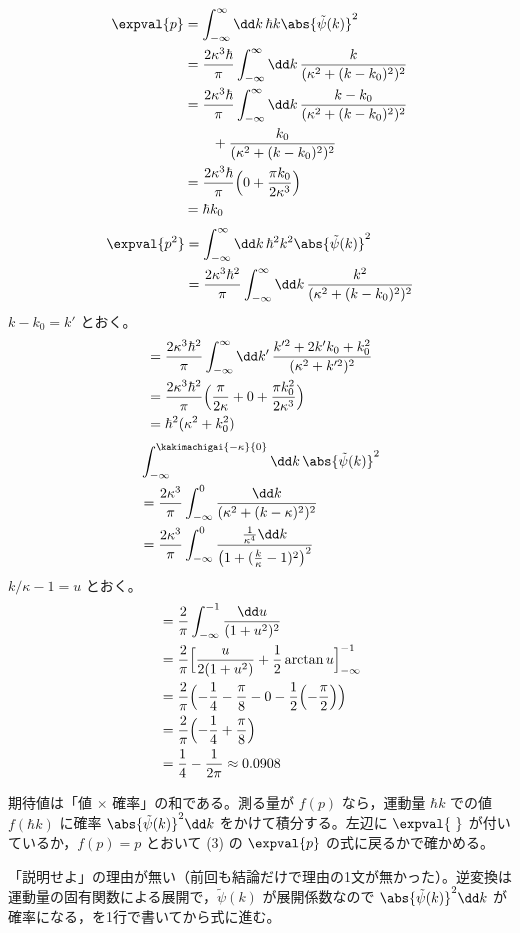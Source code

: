 \begin{align*}
\expval{p}&=\int_{-\infty}^{\infty}\dd k\,\hbar k\abs{\tilde{\psi}(k)}^{2}\\
&=\frac{2\kappa^{3}\hbar}{\pi}\int_{-\infty}^{\infty}\dd k\,\frac{k}{(\kappa^{2}+(k-k_{0})^{2})^{2}}\\
&=\frac{2\kappa^{3}\hbar}{\pi}\int_{-\infty}^{\infty}\dd k\,\frac{k-k_{0}}{(\kappa^{2}+(k-k_{0})^{2})^{2}}\\
&\qquad+\frac{k_{0}}{(\kappa^{2}+(k-k_{0})^{2})^{2}}\\
&=\frac{2\kappa^{3}\hbar}{\pi}\Bigl(0+\frac{\pi k_{0}}{2\kappa^{3}}\Bigr)\\
&=\hbar k_{0}
\end{align*}
\begin{align*}
\expval{p^{2}}&=\int_{-\infty}^{\infty}\dd k\,\hbar^{2}k^{2}\abs{\tilde{\psi}(k)}^{2}\\
&=\frac{2\kappa^{3}\hbar^{2}}{\pi}\int_{-\infty}^{\infty}\dd k\,\frac{k^{2}}{(\kappa^{2}+(k-k_{0})^{2})^{2}}
\end{align*}
$k-k_{0}=k'$ とおく。
\begin{align*}
&=\frac{2\kappa^{3}\hbar^{2}}{\pi}\int_{-\infty}^{\infty}\dd k'\,\frac{k'^{2}+2k'k_{0}+k_{0}^{2}}{(\kappa^{2}+k'^{2})^{2}}\\
&=\frac{2\kappa^{3}\hbar^{2}}{\pi}\Bigl(\frac{\pi}{2\kappa}+0+\frac{\pi k_{0}^{2}}{2\kappa^{3}}\Bigr)\\
&=\hbar^{2}(\kappa^{2}+k_{0}^{2})
\end{align*}
\begin{align*}
&\int_{-\infty}^{\kakimachigai{-\kappa}{0}}\dd k\,\abs{\tilde{\psi}(k)}^{2}\\
&=\frac{2\kappa^{3}}{\pi}\int_{-\infty}^{0}\frac{\dd k}{(\kappa^{2}+(k-\kappa)^{2})^{2}}\\
&=\frac{2\kappa^{3}}{\pi}\int_{-\infty}^{0}\frac{\frac{1}{\kappa^{4}}\dd k}{\bigl(1+(\frac{k}{\kappa}-1)^{2}\bigr)^{2}}
\end{align*}
$k/\kappa-1=u$ とおく。
\begin{align*}
&=\frac{2}{\pi}\int_{-\infty}^{-1}\frac{\dd u}{(1+u^{2})^{2}}\\
&=\frac{2}{\pi}\Bigl[\frac{u}{2(1+u^{2})}+\frac{1}{2}\arctan u\Bigr]_{-\infty}^{-1}\\
&=\frac{2}{\pi}\Bigl(-\frac{1}{4}-\frac{\pi}{8}-0-\frac{1}{2}\Bigl(-\frac{\pi}{2}\Bigr)\Bigr)\\
&=\frac{2}{\pi}\Bigl(-\frac{1}{4}+\frac{\pi}{8}\Bigr)\\
&=\frac{1}{4}-\frac{1}{2\pi}\approx0.0908
\end{align*}
\item 期待値は「値 $\times$ 確率」の和である。測る量が $f(p)$ なら，運動量 $\hbar k$ での値 $f(\hbar k)$ に確率 $\abs{\tilde{\psi}(k)}^{2}\dd k$ をかけて積分する。左辺に $\expval{\ }$ が付いているか，$f(p)=p$ とおいて (3) の $\expval{p}$ の式に戻るかで確かめる。
\item {} 「説明せよ」の理由が無い（前回も結論だけで理由の1文が無かった）。逆変換は運動量の固有関数による展開で，$\tilde{\psi}(k)$ が展開係数なので $\abs{\tilde{\psi}(k)}^{2}\dd k$ が確率になる，を1行で書いてから式に進む。
